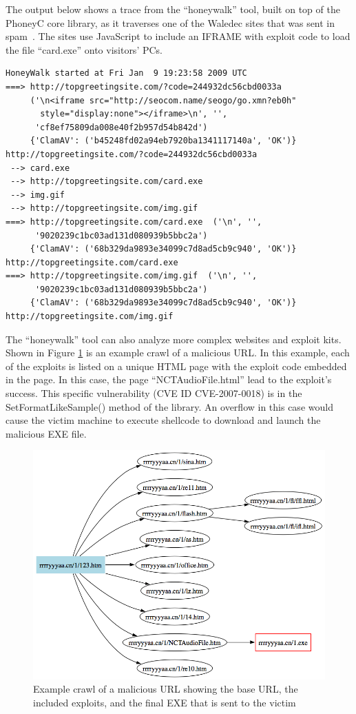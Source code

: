 \documentclass[10pt,twocolumn]{article}
\begin{document}
The output below shows a trace from the ``honeywalk'' tool, built on top of the PhoneyC core library, as it traverses one of the Waledec sites that was sent in spam~\cite{waledec}. The sites use JavaScript to include an IFRAME with exploit code to load the file ``card.exe'' onto visitors' PCs. 
\scriptsize
\begin{verbatim}
HoneyWalk started at Fri Jan  9 19:23:58 2009 UTC
===> http://topgreetingsite.com/?code=244932dc56cbd0033a  
     ('\n<iframe src="http://seocom.name/seogo/go.xmn?eb0h" 
       style="display:none"></iframe>\n', '', 
      'cf8ef75809da008e40f2b957d54b842d') 
     {'ClamAV': ('b45248fd02a94eb7920ba1341117140a', 'OK')}
http://topgreetingsite.com/?code=244932dc56cbd0033a
 --> card.exe
 --> http://topgreetingsite.com/card.exe
 --> img.gif
 --> http://topgreetingsite.com/img.gif
===> http://topgreetingsite.com/card.exe  ('\n', '', 
      '9020239c1bc03ad131d080939b5bbc2a') 
     {'ClamAV': ('68b329da9893e34099c7d8ad5cb9c940', 'OK')}
http://topgreetingsite.com/card.exe
===> http://topgreetingsite.com/img.gif  ('\n', '', 
      '9020239c1bc03ad131d080939b5bbc2a') 
     {'ClamAV': ('68b329da9893e34099c7d8ad5cb9c940', 'OK')}
http://topgreetingsite.com/img.gif
\end{verbatim}
\normalsize

The ``honeywalk'' tool can also analyze more complex websites and exploit kits. Shown in Figure \ref{fig:example-walk} is an example crawl of a malicious URL. In this example, each of the exploits is listed on a unique HTML page with the exploit code embedded in the page. In this case, the page ``NCTAudioFile.html'' lead to the exploit's success. This specific vulnerability (CVE ID CVE-2007-0018) is in the SetFormatLikeSample() method of the library. An overflow in this case would cause the victim machine to execute shellcode to download and launch the malicious EXE file. 

\begin{figure}[tb]
  \centering
  \includegraphics[width=\columnwidth]{pics/example_walk}
  \caption{Example crawl of a malicious URL showing the base URL, the included exploits, and the final EXE that is sent to the victim}
  \label{fig:example-walk}
\end{figure}
\end{document}
